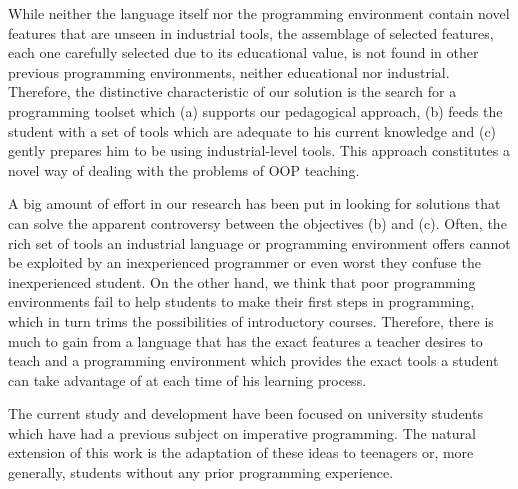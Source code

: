 While neither the language itself nor the programming environment contain novel features that are unseen in industrial tools,
the assemblage of selected features, each one carefully selected due to its educational value,
is not found in other previous programming environments, neither educational nor industrial.
Therefore, the distinctive characteristic of our solution is the search for a programming toolset which 
(a) supports our pedagogical approach,
(b) feeds the student with a set of tools which are adequate to his current knowledge
and (c) gently prepares him to be using industrial-level tools. This approach constitutes a novel way of dealing with the problems of OOP teaching.

A big amount of effort in our research has been put in looking for solutions that can solve the apparent controversy between the objectives (b) and (c).
Often, the rich set of tools an industrial language or programming environment offers cannot be exploited by an inexperienced programmer or even worst they confuse the inexperienced student.
On the other hand, we think that poor programming environments fail to help students to make their first steps in programming, which in turn trims the possibilities of introductory courses.
Therefore, there is much to gain from a language that has the exact features a teacher desires to teach
and a programming environment which provides the exact tools a student can take advantage of at each time of his learning process.

The current study and development have been focused on university students which have had a previous subject on imperative programming.
The natural extension of this work is the adaptation of these ideas to teenagers or, more generally, students without any prior programming experience.
